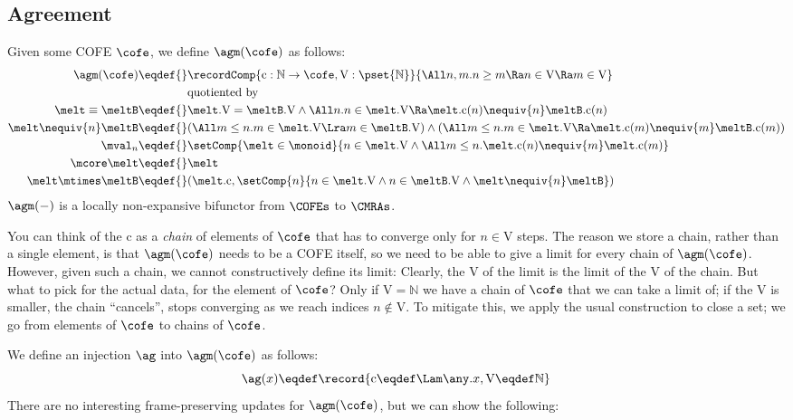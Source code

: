 \subsection{Agreement}

Given some COFE $\cofe$, we define $\agm(\cofe)$ as follows:
\newcommand{\agc}{\mathrm{c}} %
\newcommand{\agV}{\mathrm{V}} %
\begin{align*}
  \agm(\cofe) \eqdef{}& \recordComp{\agc : \mathbb{N} \to \cofe , \agV : \pset{\mathbb{N}}}{ \All n, m. n \geq m \Ra n \in \agV \Ra m \in \agV  } \\
  & \text{quotiented by} \\
  \melt \equiv \meltB \eqdef{}& \melt.\agV = \meltB.\agV \land \All n. n \in \melt.\agV \Ra \melt.\agc(n) \nequiv{n} \meltB.\agc(n) \\
  \melt \nequiv{n} \meltB \eqdef{}& (\All m \leq n. m \in \melt.\agV \Lra m \in \meltB.\agV) \land (\All m \leq n. m \in \melt.\agV \Ra \melt.\agc(m) \nequiv{m} \meltB.\agc(m)) \\
  \mval_n \eqdef{}& \setComp{\melt \in \monoid}{ n \in \melt.\agV \land \All m \leq n. \melt.\agc(n) \nequiv{m} \melt.\agc(m) } \\
  \mcore\melt \eqdef{}& \melt \\
  \melt \mtimes \meltB \eqdef{}& (\melt.\agc, \setComp{n}{n \in \melt.\agV \land n \in \meltB.\agV \land \melt \nequiv{n} \meltB })
\end{align*}
$\agm(-)$ is a locally non-expansive bifunctor from $\COFEs$ to $\CMRAs$.

You can think of the $\agc$ as a \emph{chain} of elements of $\cofe$ that has to converge only for $n \in \agV$ steps.
The reason we store a chain, rather than a single element, is that $\agm(\cofe)$ needs to be a COFE itself, so we need to be able to give a limit for every chain of $\agm(\cofe)$.
However, given such a chain, we cannot constructively define its limit: Clearly, the $\agV$ of the limit is the limit of the $\agV$ of the chain.
But what to pick for the actual data, for the element of $\cofe$?
Only if $\agV = \mathbb{N}$ we have a chain of $\cofe$ that we can take a limit of; if the $\agV$ is smaller, the chain ``cancels'', \ie stops converging as we reach indices $n \notin \agV$.
To mitigate this, we apply the usual construction to close a set; we go from elements of $\cofe$ to chains of $\cofe$.

We define an injection $\ag$ into $\agm(\cofe)$ as follows:
\[ \ag(x) \eqdef \record{\mathrm c \eqdef \Lam \any. x, \mathrm V \eqdef \mathbb{N}} \]
There are no interesting frame-preserving updates for $\agm(\cofe)$, but we can show the following:
\begin{mathpar}

  
\end{mathpar}

